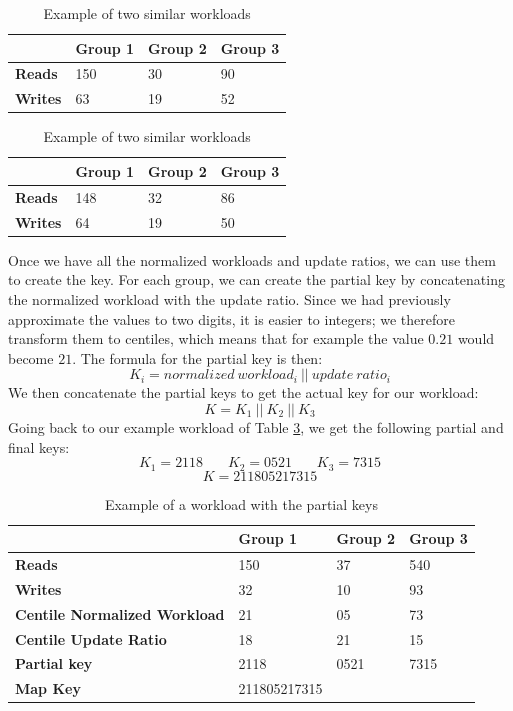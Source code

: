 \begin{table}[!htb]
  \centering
  \begin{tabular}{l l l l}
    \hline
    & \textbf{Group 1} & \textbf{Group 2} & \textbf{Group 3} \\
    \hline
    \textbf{Reads} & 150 & 30 & 90 \\
    \textbf{Writes} & 63 & 19 & 52 \\
    \hline
  \end{tabular}

  \begin{tabular}{l l l l}
    \hline
    & \textbf{Group 1} & \textbf{Group 2} & \textbf{Group 3} \\
    \hline
    \textbf{Reads} & 148 & 32 & 86 \\
    \textbf{Writes} & 64 & 19 & 50 \\

  \end{tabular}
  \caption{Example of two similar workloads}\label{tab:lru-similar-workload}
\end{table}

Once we have all the normalized workloads and update ratios, we can use them to create the key. For each group, we can create the partial key by concatenating the normalized workload with the update ratio. Since we had previously approximate the values to two digits, it is easier to integers; we therefore transform them to centiles, which means that for example the value $0.21$ would become $21$. The formula for the partial key is then:
$$K_i = normalized\ workload_i\ ||\ update\ ratio_i $$
We then concatenate the partial keys to get the actual key for our workload:
$$ K = K_1\ ||\ K_2\ ||\ K_3 $$
Going back to our example workload of Table \ref{tab:lru-workload-example}, we get the following partial and final keys:
$$ K_1 = 2118\ \ \ \ \ \ \ \ K_2 = 0521\ \ \ \ \ \ \ \ K_3 =7315 $$
$$ K = 211805217315 $$

\begin{table}[!htb]
  \centering
  \begin{tabular}{l l l l}
    \hline
    & \textbf{Group 1} & \textbf{Group 2} & \textbf{Group 3} \\
    \hline
    \textbf{Reads} & 150 & 37 & 540 \\
    \textbf{Writes} & 32 & 10 & 93 \\
    \hline
    \textbf{Centile Normalized Workload} & 21 & 05 & 73 \\
    \textbf{Centile Update Ratio} & 18 & 21 & 15 \\
    \textbf{Partial key} & 2118 & 0521 & 7315 \\
    \hline
    \textbf{Map Key} & 211805217315 & & \\
  \end{tabular}
  \caption{Example of a workload with the partial keys}\label{tab:lru-workload-example}
\end{table}


